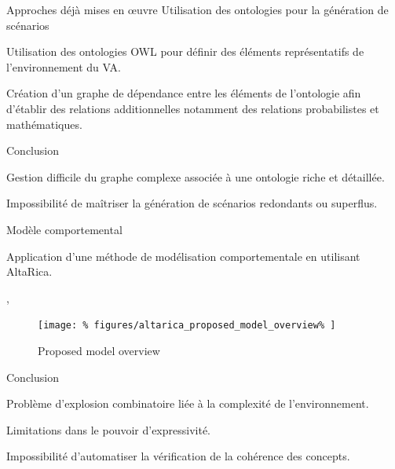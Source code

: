 \documentclass[
  hyperref={
    pdfusetitle,
    pdfencoding=auto,
    psdextra,
    colorlinks=true,
    linkcolor=darkblue,
    citecolor=darkred,
    urlcolor=darkblue,
  },
  9pt,
  aspectratio=169,
]{beamer}
\begin{document}
\begin{frame}[allowframebreaks]{Approches déjà mises en œuvre}
  \alert{Utilisation des ontologies pour la génération de scénarios}

  Utilisation des ontologies \gls{OWL} pour définir des éléments représentatifs de l'environnement du \gls{VA}.

  Création d'un graphe de dépendance
  entre les éléments de l'ontologie
  afin d'établir des relations additionnelles
  notamment des relations probabilistes et mathématiques.

  \alert{Conclusion}

  Gestion difficile du graphe complexe
  associée à une ontologie riche et détaillée.

  Impossibilité de maîtriser la génération
  de scénarios redondants ou superflus.

  \framebreak{}



  \alert{Modèle comportemental}

  Application d'une méthode de modélisation comportementale
  en utilisant AltaRica.

  \citeauthor{tlig-2018-autonomous}
  ,
  \citeyear{tlig-2018-autonomous}

  \begin{figure}
    \centering
    \texttt{[image: \%
      figures/altarica\_proposed\_model\_overview\%
    ]}
    \caption{%
      \label{fig-altarica-proposed-model-overview}%
      Proposed model overview~\cite[2]{tlig-2018-autonomous}%
    }
  \end{figure}

  \alert{Conclusion}

  Problème d'explosion combinatoire liée à la complexité de l'environnement.

  Limitations dans le pouvoir d'expressivité.

  Impossibilité d'automatiser la vérification de
  la cohérence des concepts.

\end{frame}
\end{document}
